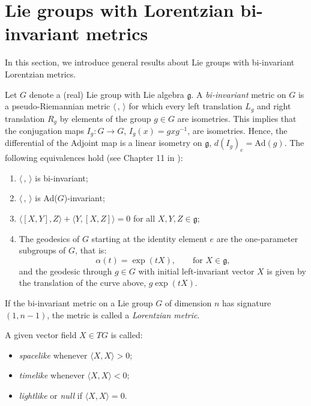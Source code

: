 \documentclass[12pt]{amsart}
\theoremstyle{plain}
\theoremstyle{definition}
\theoremstyle{remark}
\begin{document}
	
	
\section{Lie groups with Lorentzian bi-invariant metrics}\label{section1}

In this section, we introduce general results about Lie groups with bi-invariant Lorentzian metrics.

Let \( G \) denote a (real) Lie group with Lie algebra \( \mathfrak{g} \). A \textit{bi-invariant} metric on \( G \) is a pseudo-Riemannian metric \( \langle \,,\, \rangle \) for which every left translation \( L_g \) and right translation \( R_g \) by elements of the group \( g \in G \) are isometries. This implies that the conjugation maps \( I_g: G \to G \), \( I_g(x) = gxg^{-1} \), are isometries. Hence, the differential of the Adjoint map is a linear isometry on \( \mathfrak{g} \), \( d(I_g)_e = \text{Ad}(g) \). The following equivalences hold (see Chapter 11 in \cite{ON}):

\begin{enumerate}\label{[(i)]}
    \item \( \langle \,,\, \rangle \) is bi-invariant;
    \item \( \langle \,,\, \rangle \) is Ad(\( G \))-invariant;
    \item \( \langle [X, Y], Z \rangle + \langle Y, [X, Z] \rangle = 0 \) for all \( X, Y, Z \in \mathfrak{g} \);
    \item The geodesics of \( G \) starting at the identity element \( e \) are the one-parameter subgroups of \( G \), that is:
    \begin{equation}\label{onepara}
        \alpha(t) = \exp(tX), \qquad \text{for } X \in \mathfrak{g},
    \end{equation}
    and the geodesic through \( g \in G \) with initial left-invariant vector \( X \) is given by the translation of the curve above, \( g\exp(tX) \).
\end{enumerate}

If the bi-invariant metric on a Lie group \( G \) of dimension \( n \) has signature \( (1, n-1) \), the metric is called a \textit{Lorentzian metric}.

A given vector field \( X \in TG \) is called:
\begin{itemize}
    \item \textit{spacelike} whenever \( \langle X, X \rangle > 0 \);
    \item \textit{timelike} whenever \( \langle X, X \rangle < 0 \);
    \item \textit{lightlike} or \textit{null} if \( \langle X, X \rangle = 0 \).
\end{itemize}
\end{document}
